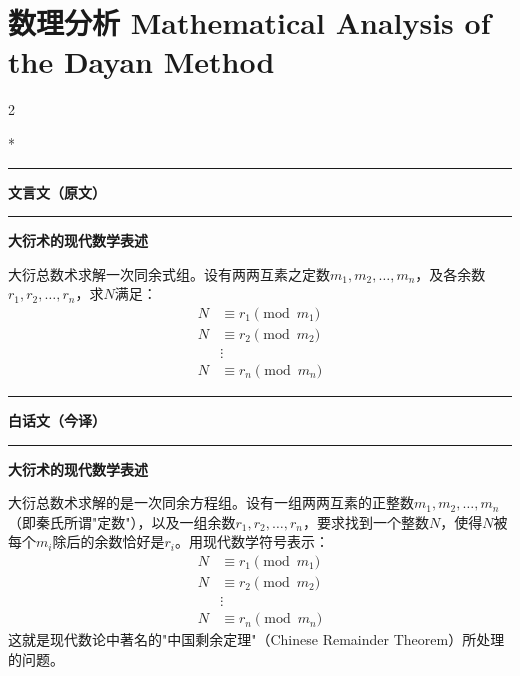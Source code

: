 \documentclass[11pt,a4paper]{article}
\newcommand{\zhtext}[1]{{\chinese #1}}
\newcommand{\leftcolheader}{%
  \noindent\textcolor{leftheader}{\rule{\columnwidth}{1.5pt}}\par
  \vspace{2pt}
  \noindent\textbf{\color{leftheader}\chinese 文言文（原文）}\par
  \vspace{2pt}
  \noindent\textcolor{leftheader}{\rule{\columnwidth}{0.6pt}}\par
  \vspace{4pt}
}
\newcommand{\rightcolheader}{%
  \noindent\textcolor{rightheader}{\rule{\columnwidth}{1.5pt}}\par
  \vspace{2pt}
  \noindent\textbf{\color{rightheader}\chinese 白话文（今译）}\par
  \vspace{2pt}
  \noindent\textcolor{rightheader}{\rule{\columnwidth}{0.6pt}}\par
  \vspace{4pt}
}
\begin{document}
\newpage

\section{\zhtext{数理分析} Mathematical Analysis of the Dayan Method}

\begin{paracol}{2}

\switchcolumn[0]*\leftcolheader

\small
\textbf{\zhtext{大衍术的现代数学表述}}

大衍总数术求解一次同余式组。设有两两互素之定数$m_1, m_2, \ldots, m_n$，及各余数$r_1, r_2, \ldots, r_n$，求$N$满足：
\begin{align*}
N &\equiv r_1 \pmod{m_1} \\
N &\equiv r_2 \pmod{m_2} \\
&\vdots \\
N &\equiv r_n \pmod{m_n}
\end{align*}

\switchcolumn\rightcolheader

\small\color{prefacecolor}
\textbf{大衍术的现代数学表述}

大衍总数术求解的是一次同余方程组。设有一组两两互素的正整数$m_1, m_2, \ldots, m_n$（即秦氏所谓"定数"），以及一组余数$r_1, r_2, \ldots, r_n$，要求找到一个整数$N$，使得$N$被每个$m_i$除后的余数恰好是$r_i$。用现代数学符号表示：
\begin{align*}
N &\equiv r_1 \pmod{m_1} \\
N &\equiv r_2 \pmod{m_2} \\
&\vdots \\
N &\equiv r_n \pmod{m_n}
\end{align*}
这就是现代数论中著名的"中国剩余定理"（Chinese Remainder Theorem）所处理的问题。

\end{paracol}
\end{document}
